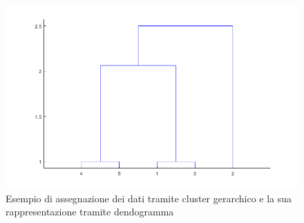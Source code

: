 \begin{figure}[h!]
	\centering
	\includegraphics[scale=0.50]{images/example_dendogram.png}
	\caption{Esempio di assegnazione dei dati tramite cluster gerarchico e la sua rappresentazione tramite dendogramma}
\end{figure}
